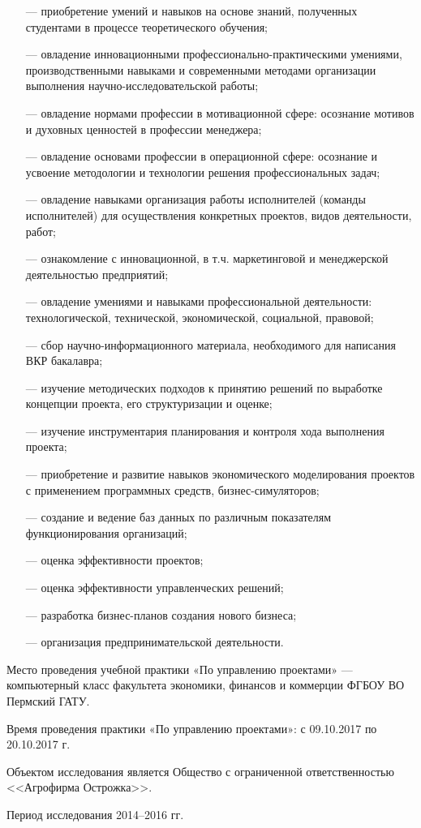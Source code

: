 \begin{itemize}
	\item [---] приобретение умений и навыков на основе знаний, полученных студентами в процессе теоретического обучения; 
	\item [---] овладение инновационными профессионально-практическими умениями, производственными навыками и современными методами организации выполнения научно-исследовательской работы; 
	\item [---] овладение нормами профессии в мотивационной сфере: осознание мотивов и духовных ценностей в профессии менеджера; 
	\item [---] овладение основами профессии в операционной сфере: осознание и усвоение методологии и технологии решения профессиональных задач;
	\item [---] овладение навыками организация работы исполнителей (команды исполнителей) для осуществления конкретных проектов, видов деятельности, работ; 
	\item [---] ознакомление с инновационной, в т.ч. маркетинговой и менеджерской деятельностью предприятий; 
	\item [---] овладение умениями и навыками профессиональной деятельности: технологической, технической, экономической, социальной, правовой;
	\item [---] сбор научно-информационного материала, необходимого для написания ВКР бакалавра; 
	\item [---] изучение методических подходов к принятию решений по выработке концепции проекта, его структуризации и оценке; 
	\item [---] изучение инструментария планирования и контроля хода выполнения проекта;
	\item [---] приобретение и развитие навыков экономического моделирования проектов с применением программных средств, бизнес-симуляторов;
	\item [---] создание и ведение баз данных по различным показателям функционирования организаций; 
	\item [---] оценка эффективности проектов; 
	\item [---] оценка эффективности управленческих решений; 
	\item [---] разработка бизнес-планов создания нового бизнеса; 
	\item [---] организация предпринимательской деятельности.
\end{itemize}

Место проведения учебной практики «По управлению проектами» --- компьютерный класс факультета экономики, финансов и коммерции ФГБОУ ВО Пермский ГАТУ. 

Время проведения практики «По управлению проектами»: с 09.10.2017 по 20.10.2017 г. 

Объектом исследования является Общество с ограниченной ответственностью <<Агрофирма Острожка>>.

Период исследования 2014--2016 гг.
